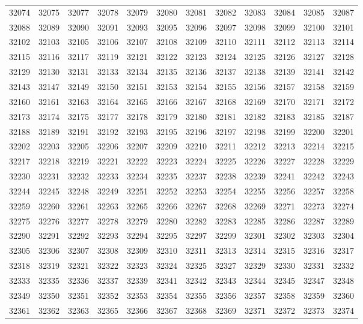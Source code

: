 \begin{center}
\begin{longtable}{llllllllllll}
32074 &32075 &32077 &32078 &32079 &32080 &32081 &32082 &32083 &32084 &32085 &32087 \\
32088 &32089 &32090 &32091 &32093 &32095 &32096 &32097 &32098 &32099 &32100 &32101 \\
32102 &32103 &32105 &32106 &32107 &32108 &32109 &32110 &32111 &32112 &32113 &32114 \\
32115 &32116 &32117 &32119 &32121 &32122 &32123 &32124 &32125 &32126 &32127 &32128 \\
32129 &32130 &32131 &32133 &32134 &32135 &32136 &32137 &32138 &32139 &32141 &32142 \\
32143 &32147 &32149 &32150 &32151 &32153 &32154 &32155 &32156 &32157 &32158 &32159 \\
32160 &32161 &32163 &32164 &32165 &32166 &32167 &32168 &32169 &32170 &32171 &32172 \\
32173 &32174 &32175 &32177 &32178 &32179 &32180 &32181 &32182 &32183 &32185 &32187 \\
32188 &32189 &32191 &32192 &32193 &32195 &32196 &32197 &32198 &32199 &32200 &32201 \\
32202 &32203 &32205 &32206 &32207 &32209 &32210 &32211 &32212 &32213 &32214 &32215 \\
32217 &32218 &32219 &32221 &32222 &32223 &32224 &32225 &32226 &32227 &32228 &32229 \\
32230 &32231 &32232 &32233 &32234 &32235 &32237 &32238 &32239 &32241 &32242 &32243 \\
32244 &32245 &32248 &32249 &32251 &32252 &32253 &32254 &32255 &32256 &32257 &32258 \\
32259 &32260 &32261 &32263 &32265 &32266 &32267 &32268 &32269 &32271 &32273 &32274 \\
32275 &32276 &32277 &32278 &32279 &32280 &32282 &32283 &32285 &32286 &32287 &32289 \\
32290 &32291 &32292 &32293 &32294 &32295 &32297 &32299 &32301 &32302 &32303 &32304 \\
32305 &32306 &32307 &32308 &32309 &32310 &32311 &32313 &32314 &32315 &32316 &32317 \\
32318 &32319 &32321 &32322 &32323 &32324 &32325 &32327 &32329 &32330 &32331 &32332 \\
32333 &32335 &32336 &32337 &32339 &32341 &32342 &32343 &32344 &32345 &32347 &32348 \\
32349 &32350 &32351 &32352 &32353 &32354 &32355 &32356 &32357 &32358 &32359 &32360 \\
32361 &32362 &32363 &32365 &32366 &32367 &32368 &32369 &32371 &32372 &32373 &32374 \\

\end{longtable}
\end{center}
